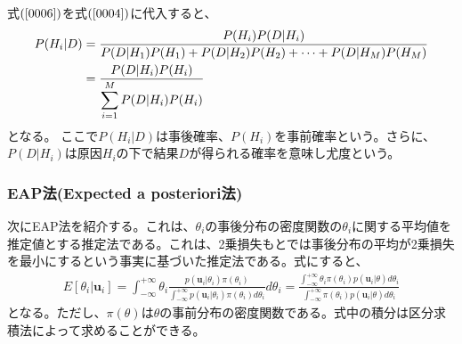 \documentclass[12pt]{jarticle}
\numberwithin{equation}{subsection}
\begin{document}
  式$(\ref{0006})$を式$(\ref{0004})$に代入すると、
  \begin{align}
    \label{0007}
    \displaystyle
    P(H_i|D) &= \frac{P(H_i)P(D|H_i)}{P(D|H_1)P(H_1) + P(D|H_2)P(H_2) + \cdots + P(D|H_M)P(H_M)} \notag \\
    &= \frac{P(D|H_i)P(H_i)}{\displaystyle\sum_{i = 1}^M P(D|H_i)P(H_i)}
  \end{align}
  となる。
  ここで$P(H_i|D)$は事後確率、$P(H_i)$を事前確率という。さらに、$P(D|H_i)$は原因$H_i$の下で結果$D$が得られる確率を意味し尤度という。
\subsubsection{EAP法(Expected a posteriori法)}
次にEAP法を紹介する。これは、$\theta_i$の事後分布の密度関数の$\theta_i$に関する平均値を推定値とする推定法である。これは、2乗損失もとでは事後分布の平均が2乗損失を最小にするという事実に基づいた推定法である。式にすると、
\begin{align}
  \displaystyle
  E[\theta_i | \boldsymbol{u}_i] = \int_{-\infty}^{+\infty} \theta_i \frac{p(\boldsymbol{u}_i | \theta_i)\pi(\theta_i)}{\displaystyle \int_{-\infty}^{+\infty} p(\boldsymbol{u}_i | \theta_i)\pi(\theta_i) d\theta_i} d\theta_i =  \frac{\displaystyle\int_{-\infty}^{+\infty} \theta_i \pi(\theta_i)p(\boldsymbol{u}_i|\theta) d\theta_i}{\displaystyle\int_{-\infty}^{+\infty}  \pi(\theta_i)p(\boldsymbol{u}_i|\theta) d\theta_i}
\end{align}
となる。ただし、$\pi(\theta)$は$\theta$の事前分布の密度関数である。式中の積分は区分求積法によって求めることができる。
\end{document}
